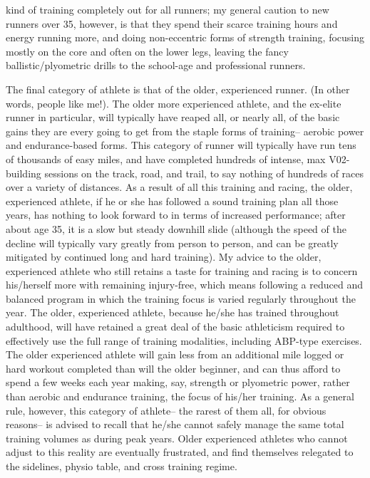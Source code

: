 kind of training completely out for all runners; my general caution to new runners over 35, however, is that they spend their scarce training hours and energy running more, and doing non-eccentric forms of strength training, focusing mostly on the core and often on the lower legs, leaving the fancy ballistic/plyometric drills to the school-age and professional runners.

The final category of athlete is that of the older, experienced runner. (In other words, people like me!). The older more experienced athlete, and the ex-elite runner in particular, will typically have reaped all, or nearly all, of the basic gains they are every going to get from the staple forms of training-- aerobic power and endurance-based forms. This category of runner will typically have run tens of thousands of easy miles, and have completed hundreds of intense, max V02-building sessions on the track, road, and trail, to say nothing of hundreds of races over a variety of distances. As a result of all this training and racing, the older, experienced athlete, if he or she has followed a sound training plan all those years, has nothing to look forward to in terms of increased performance; after about age 35, it is a slow but steady downhill slide (although the speed of the decline will typically vary greatly from person to person, and can be greatly mitigated by continued long and hard training). My advice to the older, experienced athlete who still retains a taste for training and racing is to concern his/herself more with remaining injury-free, which means following a reduced and balanced program in which the training focus is varied regularly throughout the year. The older, experienced athlete, because he/she has trained throughout adulthood, will have retained a great deal of the basic athleticism required to effectively use the full range of training modalities, including ABP-type exercises. The older experienced athlete will gain less from an additional mile logged or hard workout completed than will the older beginner, and can thus afford to spend a few weeks each year making, say, strength or plyometric power, rather than aerobic and endurance training, the focus of his/her training. As a general rule, however, this category of athlete-- the rarest of them all, for obvious reasons-- is advised to recall that he/she cannot safely manage the same total training volumes as during peak years. Older experienced athletes who cannot adjust to this reality are eventually frustrated, and find themselves relegated to the sidelines, physio table, and cross training regime.

